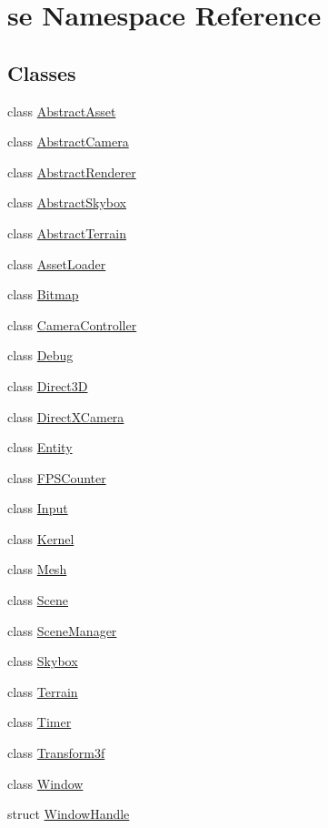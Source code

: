 \hypertarget{namespacese}{}\section{se Namespace Reference}
\label{namespacese}
\subsection*{Classes}
\begin{DoxyCompactItemize}
\item 
class \mbox{\hyperlink{classse_1_1_abstract_asset}{Abstract\+Asset}}
\item 
class \mbox{\hyperlink{classse_1_1_abstract_camera}{Abstract\+Camera}}
\item 
class \mbox{\hyperlink{classse_1_1_abstract_renderer}{Abstract\+Renderer}}
\item 
class \mbox{\hyperlink{classse_1_1_abstract_skybox}{Abstract\+Skybox}}
\item 
class \mbox{\hyperlink{classse_1_1_abstract_terrain}{Abstract\+Terrain}}
\item 
class \mbox{\hyperlink{classse_1_1_asset_loader}{Asset\+Loader}}
\item 
class \mbox{\hyperlink{classse_1_1_bitmap}{Bitmap}}
\item 
class \mbox{\hyperlink{classse_1_1_camera_controller}{Camera\+Controller}}
\item 
class \mbox{\hyperlink{classse_1_1_debug}{Debug}}
\item 
class \mbox{\hyperlink{classse_1_1_direct3_d}{Direct3D}}
\item 
class \mbox{\hyperlink{classse_1_1_direct_x_camera}{Direct\+X\+Camera}}
\item 
class \mbox{\hyperlink{classse_1_1_entity}{Entity}}
\item 
class \mbox{\hyperlink{classse_1_1_f_p_s_counter}{F\+P\+S\+Counter}}
\item 
class \mbox{\hyperlink{classse_1_1_input}{Input}}
\item 
class \mbox{\hyperlink{classse_1_1_kernel}{Kernel}}
\item 
class \mbox{\hyperlink{classse_1_1_mesh}{Mesh}}
\item 
class \mbox{\hyperlink{classse_1_1_scene}{Scene}}
\item 
class \mbox{\hyperlink{classse_1_1_scene_manager}{Scene\+Manager}}
\item 
class \mbox{\hyperlink{classse_1_1_skybox}{Skybox}}
\item 
class \mbox{\hyperlink{classse_1_1_terrain}{Terrain}}
\item 
class \mbox{\hyperlink{classse_1_1_timer}{Timer}}
\item 
class \mbox{\hyperlink{classse_1_1_transform3f}{Transform3f}}
\item 
class \mbox{\hyperlink{classse_1_1_window}{Window}}
\item 
struct \mbox{\hyperlink{structse_1_1_window_handle}{Window\+Handle}}
\end{DoxyCompactItemize}
